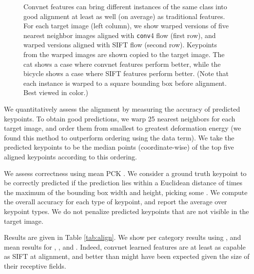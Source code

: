 \documentclass{article} \usepackage{nips14submit_e,times}
\newcommand{\trevor}[1]{}
\begin{document}
\begin{figure}[t]
{\begin{tabular}{crccccc}
\end{tabular}
}
\caption{
Convnet features can bring different instances of the same class into good
alignment at least as well (on average) as traditional features.
For each target image (left column), we show warped versions of five nearest
neighbor images aligned with \texttt{conv}4 flow (first row), and warped
versions aligned with SIFT flow \cite{sift-flow} (second row).
Keypoints from the warped images are shown copied to the target image.
The cat shows a case where convnet features perform better, while the bicycle shows
a case where SIFT features perform better.
(Note that each instance is warped to a square bounding box before alignment.
Best viewed in color.)
\trevor{Mention flipping? or flip in figure? Otherwise the second on looks like an error.}}
\label{fig:align}
\end{figure}

We quantitatively assess the alignment by measuring the accuracy of predicted
keypoints. To obtain good predictions, we warp 25 nearest neighbors for each
target image, and order them from smallest to greatest deformation energy
(we
found this method to outperform ordering using the data term).
We take the predicted keypoints to be the median points (coordinate-wise) of the
top five aligned keypoints according to this ordering.

We assess correctness using mean PCK \cite{PCP}.
We consider a ground truth keypoint to be correctly predicted if the prediction
lies within a Euclidean distance of  times the maximum of the
bounding box width and height, picking some .
We compute the overall accuracy for each type of keypoint,
and report the average over keypoint types.
We do not penalize predicted keypoints that are not visible
in the target image.

Results are given in Table \ref{tab:align}. We show per category results using
, and mean results for , , and . 
Indeed, convnet learned features are at least as capable as SIFT at
alignment, and better than might have been expected 
given the size of their receptive fields.
\end{document}

